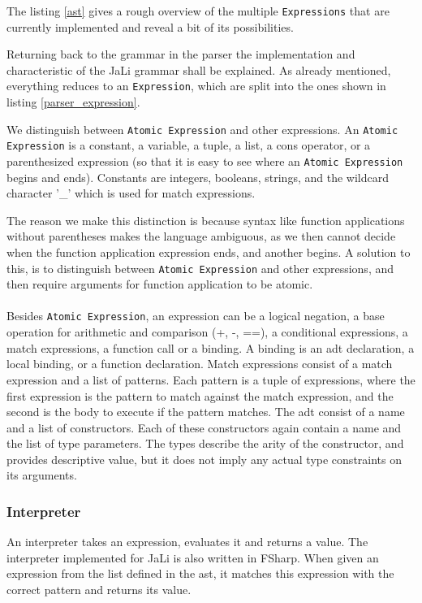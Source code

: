 \vspace{0.3cm}

The listing \ref{ast} gives a rough overview of the multiple \texttt{Expressions} that are currently implemented and reveal a bit of its possibilities.

Returning back to the grammar in the parser the implementation and characteristic of the JaLi grammar shall be explained.
As already mentioned, everything reduces to an \texttt{Expression}, which are split into the ones shown in listing \ref{parser_expression}.

We distinguish between \texttt{Atomic Expression} and other expressions. An \texttt{Atomic Expression} is a constant, a variable, a tuple, a list, a cons operator, or a parenthesized expression (so that it is easy to see where an \texttt{Atomic Expression} begins and ends). Constants are integers, booleans, strings, and the wildcard character '\_' which is used for match expressions.

The reason we make this distinction is because syntax like function applications without parentheses makes the language ambiguous, as we then cannot decide when the function application expression ends, and another begins. A solution to this, is to distinguish between \texttt{Atomic Expression} and other expressions, and then require arguments for function application to be atomic. 
\\\\
Besides \texttt{Atomic Expression}, an expression can be a logical negation, a base operation for arithmetic and comparison (+, -, ==), a conditional expressions, a match expressions, a function call or a binding. A binding is an \gls{adt} declaration, a local binding, or a function declaration. Match expressions consist of a match expression and a list of patterns. Each pattern is a tuple of expressions, where the first expression is the pattern to match against the match expression, and the second is the body to execute if the pattern matches. The \gls{adt} consist of a name and a list of constructors. Each of these constructors again contain a name and the list of type parameters. The types describe the arity of the constructor, and provides descriptive value, but it does not imply any actual type constraints on its arguments. 



\subsubsection{Interpreter}
An interpreter takes an expression, evaluates it and returns a value. The interpreter implemented for JaLi is also written in FSharp.
When given an expression from the list defined in the \gls{ast}, it matches this expression with the correct pattern and returns its value.

